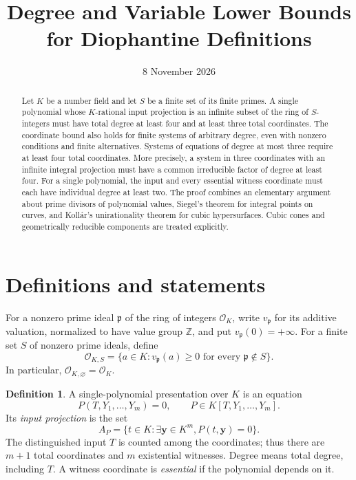 \documentclass[11pt,a4paper]{article}
\title{Degree and Variable Lower Bounds\\for Diophantine Definitions}
\author{}
\date{8 November 2026}
\theoremstyle{definition}
\newtheorem{definition}[theorem]{Definition}
\newcommand{\OKS}{\mathcal O_{K,S}}
\begin{document}
\maketitle
\begin{abstract}
Let $K$ be a number field and let $S$ be a finite set of its finite
primes. A single polynomial whose $K$-rational input projection is
an infinite subset of the ring of $S$-integers must have total
degree at least four and at least three total coordinates. The
coordinate bound also holds for finite systems of arbitrary degree,
even with nonzero conditions and finite alternatives. Systems of
equations of degree at most three require at least four total
coordinates. More precisely, a system in three coordinates with an
infinite integral projection must have a common irreducible factor
of degree at least four. For a single polynomial, the input and every essential witness coordinate must
each have individual degree at least two. The proof combines an
elementary argument about prime divisors of polynomial values,
Siegel's theorem for integral points on curves, and Koll\'ar's
unirationality theorem for cubic hypersurfaces. Cubic cones and
geometrically reducible components are treated explicitly.
\end{abstract}

\section{Definitions and statements}

For a nonzero prime ideal $\mathfrak p$ of the ring of integers
$\mathcal O_K$, write $v_{\mathfrak p}$ for its additive valuation,
normalized to have value group $\mathbb Z$, and put
$v_{\mathfrak p}(0)=+\infty$. For a finite set $S$ of nonzero
prime ideals, define
\[
 \OKS=\{a\in K: v_{\mathfrak p}(a)\ge0
                       \text{ for every }\mathfrak p\notin S\}.
\]
In particular, $\mathcal O_{K,\varnothing}=\mathcal O_K$.

\begin{definition}
A single-polynomial presentation over $K$ is an equation
\[
                P(T,Y_1,\ldots,Y_m)=0,
       \qquad P\in K[T,Y_1,\ldots,Y_m].
\]
Its \emph{input projection} is the set
\[
 A_P=\{t\in K:\exists \mathbf y\in K^m, P(t,\mathbf y)=0\}.
\]
The distinguished input $T$ is counted among the coordinates; thus
there are $m+1$ total coordinates and $m$ existential witnesses.
Degree means total degree, including $T$. A witness coordinate is
\emph{essential} if the polynomial depends on it.
\end{definition}
\end{document}
